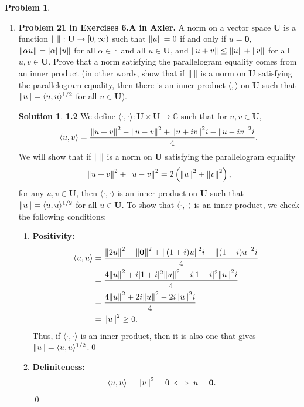 \documentclass{article}
\theoremstyle{definition}
\newtheorem*{prob*}{Problem}
\newtheorem*{sln*}{Solution}
\newcommand{\U}{\mathbf{U}}
\newcommand{\la}{\langle}
\newcommand{\ra}{\rangle}
\begin{document}
\begin{prob*}
\begin{enumerate}
		
		\newpage
		
		
		
		\item \textbf{Problem 21 in Exercises 6.A in Axler.} A norm on a vector space $\U$ is a function $\norm{\,}: \U \to [0,\infty) $ such that $\norm{u} = 0$ if and only if $u = \mathbf{0}$, $\norm{\alpha u} = \vert \alpha \vert \norm{u}$ for all $\alpha \in \mathbb{F}$ and all $u \in \U$, and $\norm{u + v} \leq \norm{u} + \norm{v}$ for all $u,v \in \U$. Prove that a norm satisfying the parallelogram equality comes from an inner product (in other words, show that if $\norm{\,}$ is a norm on $\U$ satisfying the parallelogram equality, then there is an inner product $\la ,\ra$ on $\U$ such that $\norm{u} = \la u,u\ra^{1/2}$ for all $u\in \U$). 
		
			
		\begin{sln*}\textbf{1.2}
			We define $\la \cdot,\cdot \ra : \U \times \U \to \mathbb{C}$ such that for $u,v \in \U$,
			\begin{align*}
			\la u ,v \ra = \frac{\norm{u+ v}^2  - \norm{u-v}^2 + \norm{u + iv}^2i - \norm{u - iv}^2i   }{4}.
			\end{align*} 
			We will show that if $\norm{\,}$ is a norm on $\U$ satisfying the parallelogram equality 
			\begin{align*}
			\norm{u+v}^2 + \norm{u-v}^2 = 2   \left( \norm{u}^2 + \norm{v}^2 \right),
			\end{align*}
			for any $u,v \in \U$, then $\la \cdot,\cdot\ra$ is an inner product on $\U$ such that $\norm{u} = \la u,u\ra^{1/2}$ for all $u\in \U$.  To show that $\la \cdot , \cdot \ra$ is an inner product, we check the following conditions:
			\begin{enumerate}
				\item \textbf{Positivity:}
				\begin{align*}
				\la u ,u \ra &= \frac{\norm{2u}^2  - \norm{\mathbf{0}}^2 + \norm{(1+i)u}^2i - \norm{(1-i)u}^2i   }{4}\\
				&= \frac{4\norm{u}^2 + i\vert 1+i\vert^2 \norm{u}^2 - i\vert 1 - i \vert^2 \norm{u}^2i   }{4}\\
				&= \frac{4\norm{u}^2 + 2i \norm{u}^2 - 2i \norm{u}^2i   }{4}\\
				&= \norm{u}^2 \geq 0.
				\end{align*}
				Thus, if $\la \cdot, \cdot \ra$ is an inner product, then it is also one that gives $\norm{u} = \la u,u\ra^{1/2}$.\qed
				
				\item \textbf{Definiteness:}
				\begin{align*}
				\la u ,u \ra &= \norm{u}^2 = 0 \iff u = \mathbf{0}. 
				\end{align*}\qed
				

\end{enumerate}
\end{sln*}
\end{enumerate}
\end{prob*}
\end{document}
